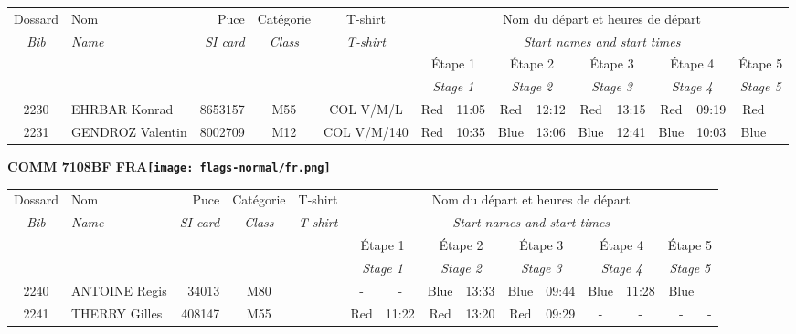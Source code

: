 \documentclass{report}
\begin{document}
  \begin{longtable}{|c|l|r|c|c|*{5}{cc|}}
    Dossard & Nom  & Puce    & Catégorie & T-shirt & \multicolumn{10}{c|}{Nom du départ et heures de départ} \\
    \itshape Bib     & \itshape Name & \itshape SI card & \itshape Class  & \itshape  T-shirt  & \multicolumn{10}{c|}{\itshape Start names and start times} \\
    \hline
    & & & & & \multicolumn{2}{c|}{Étape 1} & \multicolumn{2}{c|}{Étape 2} & \multicolumn{2}{c|}{Étape 3} & \multicolumn{2}{c|}{Étape 4} & \multicolumn{2}{c|}{Étape 5} \\
    & & & & & \multicolumn{2}{c|}{\itshape Stage 1} & \multicolumn{2}{c|}{\itshape Stage 2} & \multicolumn{2}{c|}{\itshape Stage 3} & \multicolumn{2}{c|}{\itshape Stage 4} & \multicolumn{2}{c|}{\itshape Stage 5} \\
    \hline
    2230 & EHRBAR Konrad & 8653157 & M55 & COL V/M/L & Red & 11:05 & Red & 12:12 & Red & 13:15 & Red & 09:19 & Red &  \\
    2231 & GENDROZ Valentin & 8002709 & M12 & COL V/M/140 & Red & 10:35 & Blue & 13:06 & Blue & 12:41 & Blue & 10:03 & Blue &  \\
  \end{longtable}
\newpage
  \Huge \centering \bfseries COMM 7108BF FRA\normalfont \footnotesize \sffamily \hfill \texttt{[image: flags-normal/fr.png]} \newline 
  \begin{longtable}{|c|l|r|c|c|*{5}{cc|}}
    Dossard & Nom  & Puce    & Catégorie & T-shirt & \multicolumn{10}{c|}{Nom du départ et heures de départ} \\
    \itshape Bib     & \itshape Name & \itshape SI card & \itshape Class  & \itshape  T-shirt  & \multicolumn{10}{c|}{\itshape Start names and start times} \\
    \hline
    & & & & & \multicolumn{2}{c|}{Étape 1} & \multicolumn{2}{c|}{Étape 2} & \multicolumn{2}{c|}{Étape 3} & \multicolumn{2}{c|}{Étape 4} & \multicolumn{2}{c|}{Étape 5} \\
    & & & & & \multicolumn{2}{c|}{\itshape Stage 1} & \multicolumn{2}{c|}{\itshape Stage 2} & \multicolumn{2}{c|}{\itshape Stage 3} & \multicolumn{2}{c|}{\itshape Stage 4} & \multicolumn{2}{c|}{\itshape Stage 5} \\
    \hline
    2240 & ANTOINE Regis & 34013 & M80 &   & - &  - & Blue & 13:33 & Blue & 09:44 & Blue & 11:28 & Blue &  \\
    2241 & THERRY Gilles & 408147 & M55 &   & Red & 11:22 & Red & 13:20 & Red & 09:29 & - &  - & - &  -\\
  \end{longtable}
\end{document}
